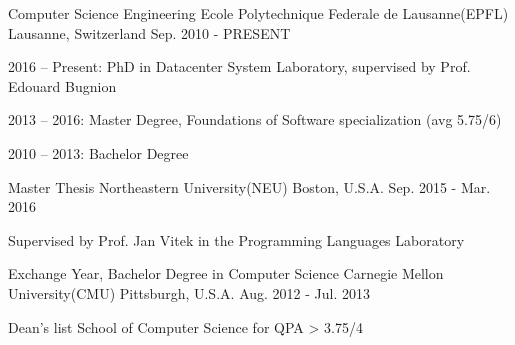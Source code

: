 


\begin{cventries}


\cventry
{Computer Science Engineering} %
{Ecole Polytechnique Federale de Lausanne(EPFL)} %
{Lausanne, Switzerland} %
{Sep. 2010 - PRESENT} %
{ %
\begin{cvitems}
\item {2016 -- Present: PhD in Datacenter System Laboratory, supervised by Prof. Edouard Bugnion}
\item {2013 -- 2016: Master Degree, Foundations of Software specialization (avg 5.75/6)}
\item {2010 -- 2013: Bachelor Degree}
\end{cvitems}
}

\cventry
{Master Thesis}
{Northeastern University(NEU)}
{Boston, U.S.A.}
{Sep. 2015 - Mar. 2016}
{
	\begin{cvitems}
	\item{Supervised by Prof. Jan Vitek in the Programming Languages Laboratory}
	\end{cvitems}
}

\cventry
{Exchange Year, Bachelor Degree in Computer Science}
{Carnegie Mellon University(CMU)}
{Pittsburgh, U.S.A.}
{Aug. 2012 - Jul. 2013}
{
	\begin{cvitems}
	\item{Dean's list School of Computer Science for QPA > 3.75/4}
	\end{cvitems}
}



\end{cventries}

